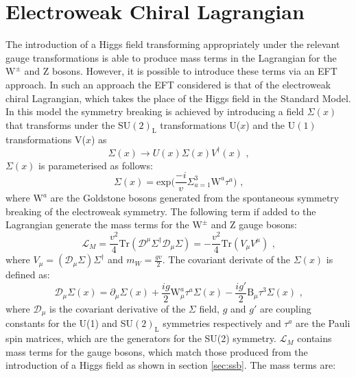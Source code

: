 
\section{Electroweak Chiral Lagrangian}
The introduction of a Higgs field transforming appropriately under the relevant gauge transformations is able to produce mass terms in the Lagrangian for the $\text{W}^{\pm}$ and Z bosons.  However, it is possible to introduce these terms via an EFT approach.  In such an approach the EFT considered is that of the electroweak chiral Lagrangian, which takes the place of the Higgs field in the Standard Model.  In this model the symmetry breaking is achieved by introducing a field $\Sigma(x)$ that transforms under the $\text{SU}(2)_{\text{L}}$ transformations U($x$) and the $\text{U}(1)$ transformations V($x$) as
%
\begin{equation}
\Sigma(x) \rightarrow U(x) \Sigma(x) V^{\dagger}(x) \text{ ,}
\end{equation}
%
\noindent $\Sigma(x)$ is parameterised as follows:
%
\begin{equation}
\Sigma(x) = \text{exp} \bigg(\frac{-i}{v} \Sigma^{3}_{a=1} \text{W}^{a}\tau^{a}\bigg)\text{ ,}
\end{equation}
%
\noindent where $\text{W}^{a}$ are the Goldstone bosons generated from the spontaneous symmetry breaking of the electroweak symmetry.  The following term if added to the Lagrangian generate the mass terms for the $\text{W}^{\pm}$ and Z gauge bosons:
%
\begin{equation}
\mathcal{L}_{M} = \frac{v^{2}}{4} \text{Tr} (\mathcal{D}^{\mu} \Sigma^{\dagger} \mathcal{D}_{\mu} \Sigma) = -\frac{v^{2}}{4}\text{Tr}(V_{\mu} V^{\mu}) \text{ ,} 
\end{equation}
%
\noindent where $V_{\mu} = (\mathcal{D}_{\mu}\Sigma) \Sigma^{\dagger}$ and $m_{W} = \frac{gv}{2}$.  The covariant derivate of the $\Sigma(x)$ is defined as:
%
\begin{equation}
\mathcal{D}_{\mu} \Sigma(x) = \partial_{\mu} \Sigma(x) + \frac{ig}{2}\text{W}_{\mu}^{a}\tau^{a}\Sigma(x) - \frac{ig'}{2}\text{B}_{\mu}\tau^{3}\Sigma(x) \text{ ,}
\end{equation}
%
\noindent where $\mathcal{D}_{\mu}$ is the covariant derivative of the $\Sigma$ field, $g$ and $g'$ are coupling constants for the U(1) and SU$(2)_\text{L}$ symmetries respectively and $\tau^{a}$ are the Pauli spin matrices, which are the generators for the SU(2) symmetry.  $\mathcal{L}_{M}$ contains mass terms for the gauge bosons, which match those produced from the introduction of a Higgs field as shown in section \ref{sec:ssb}.  The mass terms are:
